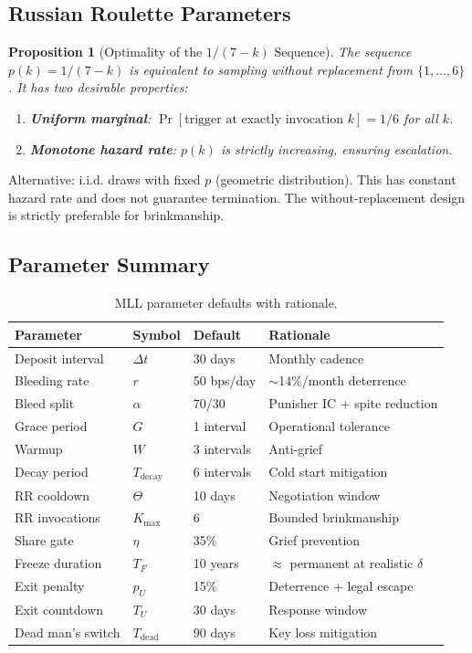 \documentclass[12pt,a4paper]{article}
\newtheorem{proposition}{Proposition}
\begin{document}
\subsection{Russian Roulette Parameters}

\begin{proposition}[Optimality of the $1/(7-k)$ Sequence]
The sequence $p(k) = 1/(7-k)$ is equivalent to sampling without replacement from $\{1,\ldots,6\}$. It has two desirable properties:
\begin{enumerate}
    \item \textbf{Uniform marginal}: $\Pr[\text{trigger at exactly invocation } k] = 1/6$ for all $k$.
    \item \textbf{Monotone hazard rate}: $p(k)$ is strictly increasing, ensuring escalation.
\end{enumerate}
\end{proposition}

Alternative: i.i.d. draws with fixed $p$ (geometric distribution). This has constant hazard rate and does not guarantee termination. The without-replacement design is strictly preferable for brinkmanship.

\subsection{Parameter Summary}

\begin{table}[h]
\centering
\begin{tabular}{llll}
\toprule
\textbf{Parameter} & \textbf{Symbol} & \textbf{Default} & \textbf{Rationale} \\
\midrule
Deposit interval & $\Delta t$ & 30 days & Monthly cadence \\
Bleeding rate & $r$ & 50 bps/day & $\sim$14\%/month deterrence \\
Bleed split & $\alpha$ & 70/30 & Punisher IC + spite reduction \\
Grace period & $G$ & 1 interval & Operational tolerance \\
Warmup & $W$ & 3 intervals & Anti-grief \\
Decay period & $T_{\text{decay}}$ & 6 intervals & Cold start mitigation \\
RR cooldown & $\Theta$ & 10 days & Negotiation window \\
RR invocations & $K_{\max}$ & 6 & Bounded brinkmanship \\
Share gate & $\eta$ & 35\% & Grief prevention \\
Freeze duration & $T_F$ & 10 years & $\approx$ permanent at realistic $\delta$ \\
Exit penalty & $p_U$ & 15\% & Deterrence + legal escape \\
Exit countdown & $T_U$ & 30 days & Response window \\
Dead man's switch & $T_{\text{dead}}$ & 90 days & Key loss mitigation \\
\bottomrule
\end{tabular}
\caption{MLL parameter defaults with rationale.}
\label{tab:params}
\end{table}
\end{document}
